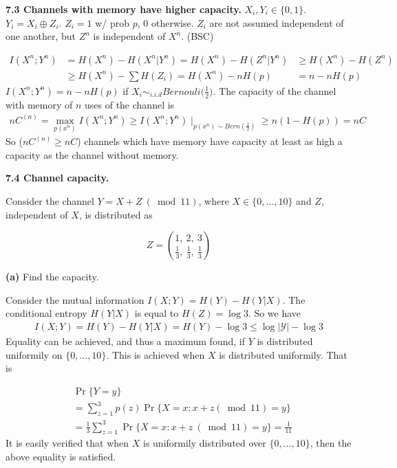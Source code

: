 \documentclass[10pt]{article}
\newcommand{\setbrace}[1]{{\{#1\}}}
\begin{document}
\begin{tiny}
\begin{multicols}{3}
\textbf{\scriptsize 7.3 Channels with memory have higher capacity.}
    $X_i, Y_i \in \{0,1\}$.
    $Y_i = X_i \oplus Z_i$.
    $Z_i = 1$ w/ prob $p$, 0 otherwise.
    $Z_i$ are not assumed independent of one another, but $Z^n$ is independent of $X^n$. (BSC)

\begin{align}
    I(X^n;Y^n) &= H(X^n) - H(X^n|Y^n) = H(X^n) - H(Z^n|Y^n) &\ge H(X^n) - H(Z^n) \nonumber\\
    &\ge H(X^n) - \sum H(Z_i) = H(X^n) - nH(p) &= n - nH(p) \nonumber
\end{align}
$I(X^n;Y^n) = n - nH(p)$ if $X_i \sim_{i.i.d} Bernouli\big(\frac{1}{2}\big)$.
The capacity of the channel with memory of $n$ uses of the channel is
\begin{align*}
    nC^{(n)} = \max_{p(x^n)} I(X^n; Y^n) 
        \ge I(X^n;Y^n)\mid_{p(x^n) \sim Bern(\frac{1}{2})} 
        \ge n ( 1 - H(p)) = nC
\end{align*}
So ($nC^{(n)} \ge nC$) channels which have memory have capacity at least as high a capacity as the channel without memory.

\textbf{\scriptsize 7.4 Channel capacity.}

Consider the channel $Y=X+Z\ (\bmod 11)$, where $X \in \setbrace{0,\dots,10}$ and $Z$, independent of $X$, is distributed as

\begin{equation*}
    Z = {{1,\ 2,\ 3}\choose{\frac{1}{3},\ \frac{1}{3},\ \frac{1}{3}}}
\end{equation*}


\textbf{(a)} Find the capacity.

Consider the mutual information $I(X;Y) = H(Y) - H(Y|X)$. The conditional
entropy $H(Y|X)$ is equal to $H(Z)=\log 3$.
So we have
\begin{eqnarray*}
    I(X;Y) = H(Y) - H(Y|X) = H(Y) - \log 3 
    \leq \log {\vert \mathcal{Y} \vert} - \log 3 \label{eq:7.4-cap}
\end{eqnarray*}
Equality can be achieved, and thus a maximum found, if $Y$ is distributed
uniformily on $\setbrace{0,\dots,10}$. This is achieved when $X$ is
distributed uniformily. That is


\begin{align*}
    &\Pr \setbrace{Y=y} \\
    &= \sum_{z=1}^{3}p(z) \Pr \setbrace{X=x : x+z (\bmod 11) = y} \\
    &= \frac{1}{3}\sum_{z=1}^{3} \Pr \setbrace{X = x : x+z\ (\bmod 11) = y} = \frac{1}{11}
\end{align*}
It is easily verified that when $X$ is uniformily distributed over
$\setbrace{0,\dots,10}$, then the above equality is satisfied.


\end{multicols}
\end{tiny}
\end{document}
